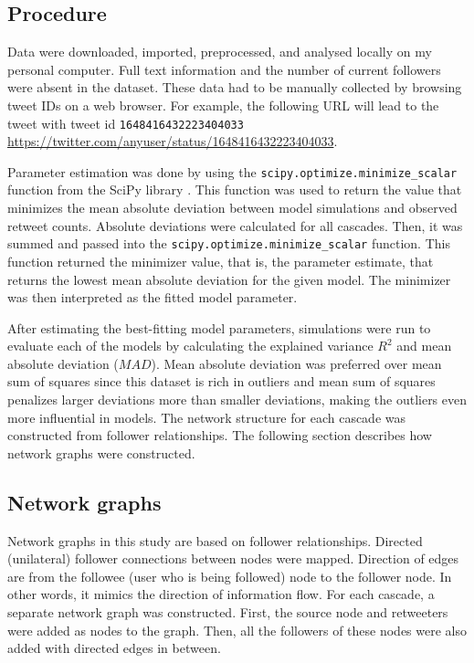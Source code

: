\documentclass[11pt,a4paper]{article}
\begin{document}
    \subsection{Procedure}
    Data were downloaded, imported, preprocessed, and analysed locally on my personal computer. Full text information and the number of current followers were absent in the dataset. These data had to be manually collected by browsing tweet IDs on a web browser. For example, the following URL will lead to the tweet with tweet id \texttt{1648416432223404033} \href{https://twitter.com/anyuser/status/1648416432223404033}{https://twitter.com/anyuser/status/1648416432223404033}.
    
    Parameter estimation was done by using the \texttt{scipy.optimize.minimize\_scalar} function from the SciPy library \cite{virtanen_scipy_2020}. This function was used to return the value that minimizes the mean absolute deviation between model simulations and observed retweet counts. Absolute deviations were calculated for all cascades. Then, it was summed and passed into the \texttt{scipy.optimize.minimize\_scalar} function. This function returned the minimizer value, that is, the parameter estimate, that returns the lowest mean absolute deviation for the given model. The minimizer was then interpreted as the fitted model parameter.
    
    After estimating the best-fitting model parameters, simulations were run to evaluate each of the models by calculating the explained variance $R^2$ and mean absolute deviation ($MAD$). Mean absolute deviation was preferred over mean sum of squares since this dataset is rich in outliers and mean sum of squares penalizes larger deviations more than smaller deviations, making the outliers even more influential in models. The network structure for each cascade was constructed from follower relationships. The following section describes how network graphs were constructed.
    
    \subsection{Network graphs}
        Network graphs in this study are based on follower relationships. Directed (unilateral) follower connections between nodes were mapped. Direction of edges are from the followee (user who is being followed) node to the follower node. In other words, it mimics the direction of information flow. For each cascade, a separate network graph was constructed. First, the source node and retweeters were added as nodes to the graph. Then, all the followers of these nodes were also added with directed edges in between.
        
\end{document}
